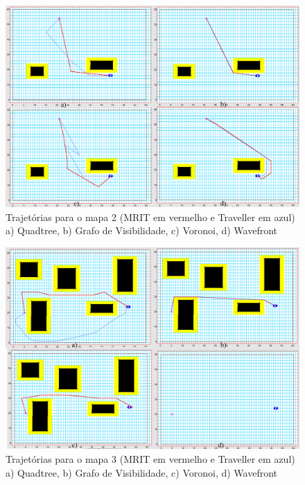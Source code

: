 \begin{figure}[h]
	\centering
	\label{fig40}
		\includegraphics[keepaspectratio=true,scale=0.25]{figuras/mapa2.jpg}
	\caption{Trajetórias para o mapa 2 (MRIT em vermelho e Traveller em azul) a) Quadtree, b) Grafo de Visibilidade, c) Voronoi, d) Wavefront}
\end{figure}

\begin{figure}[h]
	\centering
	\label{fig41}
		\includegraphics[keepaspectratio=true,scale=0.25]{figuras/mapa3.jpg}
	\caption{Trajetórias para o mapa 3 (MRIT em vermelho e Traveller em azul) a) Quadtree, b) Grafo de Visibilidade, c) Voronoi, d) Wavefront}
\end{figure}

